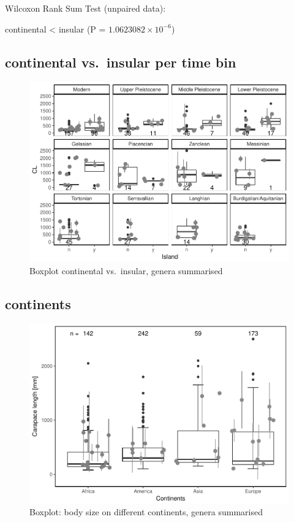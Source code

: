 \documentclass[]{article}
\begin{document}
Wilcoxon Rank Sum Test (unpaired data):

continental \textless{} insular (P = \(1.0623082\times 10^{-6}\))

\newpage

\subsection{continental vs.~insular per time
bin}\label{continental-vs.insular-per-time-bin-1}

\begin{figure}[htbp]
\centering
\includegraphics{MA_JJ_files/figure-latex/BPCIBins-1.pdf}
\caption{Boxplot continental vs.~insular, genera summarised}
\end{figure}

\newpage

\subsection{continents}\label{continents-1}

\begin{figure}[htbp]
\centering
\includegraphics{MA_JJ_files/figure-latex/BPCon-1.pdf}
\caption{Boxplot: body size on different continents, genera summarised}
\end{figure}
\end{document}
